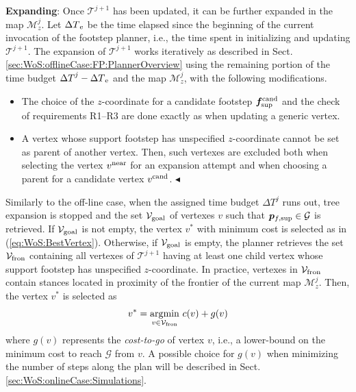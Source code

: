 {\bf Expanding}: Once $\mathcal{T}^{j+1}$ has been updated, it can be further
expanded in the map $\mathcal{M}_z^j$.
Let ${\Delta T}_{\rm e}$ be the time elapsed since the beginning of the current
invocation of the footstep planner, i.e., the time spent in initializing and
updating $\mathcal{T}^{j+1}$.
The expansion of $\mathcal{T}^{j+1}$ works iteratively as described in
Sect. \ref{sec:WoS:offlineCase:FP:PlannerOverview} using the remaining portion
of the time budget ${\Delta T}^j - {\Delta T}_{\rm e}$ and the map
$\mathcal{M}_z^j$, with the following modifications.
\begin{itemize}
    \item The choice of the $z$-coordinate for a candidate footstep
        ${\bm{f}}_{\rm sup}^{\rm cand}$ and the check of requirements R1--R3 are
        done exactly as when updating a generic vertex. 
    \item A vertex whose support footstep has unspecified $z$-coordinate
        cannot be set as parent of another vertex.
        Then, such vertexes are excluded both when selecting the vertex
        $v^{\rm near}$ for an expansion attempt and when choosing a parent for
        a candidate vertex $v^{\rm cand}$. \hfill $\blacktriangleleft$
\end{itemize} 

Similarly to the off-line case, when the assigned time budget ${\Delta T}^j$
runs out, tree expansion is stopped and the set ${\cal V}_{\rm goal}$ of
vertexes $v$ such that ${\bm{p}}_{f,{\rm sup}} \in {\cal G}$ is retrieved.
%
If ${\cal V}_{\rm goal}$ is not empty, the vertex $v^*$ with minimum cost is
selected as in (\ref{eq:WoS:BestVertex}).
%
Otherwise, if ${\cal V}_{\rm goal}$ is empty, the planner retrieves the set
${\cal V}_{\rm fron}$ containing all vertexes of $\mathcal{T}^{j+1}$ having at
least one child vertex whose support footstep has unspecified $z$-coordinate.
In practice, vertexes in ${\cal V}_{\rm fron}$ contain stances located in
proximity of the frontier of the current map $\mathcal{M}_z^j$.
Then, the vertex $v^*$ is selected as
\begin{equation}
    \label{eq:WoS:BestVertexSubgoal}
    v^* = \underset{v \in {\cal V}_{\rm fron}}{\arg\!\min} \ c(v)+g(v)
\end{equation}
where $g(v)$ represents the \textit{cost-to-go} of vertex $v$, i.e., a
lower-bound on the minimum cost to reach $\mathcal{G}$ from $v$.
A possible choice for $g(v)$ when minimizing the number of steps along the
plan will be described in Sect. \ref{sec:WoS:onlineCase:Simulations}.

